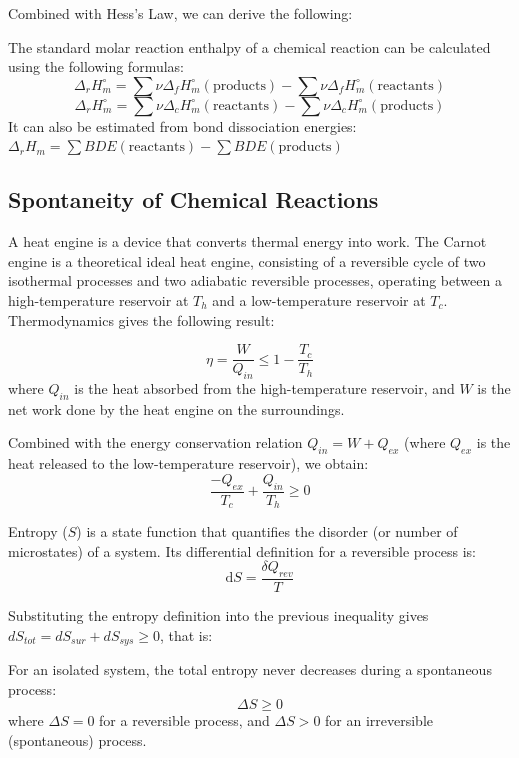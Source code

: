 Combined with Hess's Law, we can derive the following:

\begin{proposition}
The standard molar reaction enthalpy of a chemical reaction can be calculated using the following formulas:
$$\Delta_r H_m^\circ = \sum \nu \Delta_f H_m^\circ(\text{products}) - \sum \nu \Delta_f H_m^\circ(\text{reactants})$$
$$\Delta_r H_m^\circ = \sum \nu \Delta_c H_m^\circ(\text{reactants}) - \sum \nu \Delta_c H_m^\circ(\text{products})$$
It can also be estimated from bond dissociation energies: $\Delta_r H_m = \sum BDE(\text{reactants}) - \sum BDE(\text{products})$
\end{proposition}

\subsection{Spontaneity of Chemical Reactions}

A heat engine is a device that converts thermal energy into work. The Carnot engine is a theoretical ideal heat engine, consisting of a reversible cycle of two isothermal processes and two adiabatic reversible processes, operating between a high-temperature reservoir at $T_h$ and a low-temperature reservoir at $T_c$. Thermodynamics gives the following result:

\begin{proposition}
$$\eta = \frac{W}{Q_{in}} \leq 1 - \frac{T_c}{T_h}$$
where $Q_{in}$ is the heat absorbed from the high-temperature reservoir, and $W$ is the net work done by the heat engine on the surroundings.
\end{proposition}

Combined with the energy conservation relation $Q_{in} = W + Q_{ex}$ (where $Q_{ex}$ is the heat released to the low-temperature reservoir), we obtain:
$$\frac{-Q_{ex}}{T_c} + \frac{Q_{in}}{T_h} \geq 0$$

\begin{definition}[Entropy]
Entropy ($S$) is a state function that quantifies the disorder (or number of microstates) of a system. Its differential definition for a reversible process is:
$$\mathrm{d}S = \frac{\delta Q_{rev}}{T}$$
\end{definition}

Substituting the entropy definition into the previous inequality gives $dS_{tot} = dS_{sur} + dS_{sys} \geq 0$, that is:

\begin{proposition}
For an isolated system, the total entropy never decreases during a spontaneous process:
$$\Delta S \geq 0$$
where $\Delta S = 0$ for a reversible process, and $\Delta S > 0$ for an irreversible (spontaneous) process.
\end{proposition}

